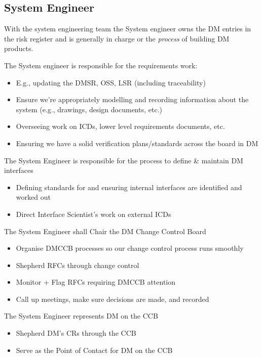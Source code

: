 \subsection{System Engineer \label{role:sysengineer}}
With the system engineering team  
 the System engineer 
 owns the DM entries in the risk register and is generally in charge or the {\em process} of building DM products. 

The System engineer  
is responsible for the requirements work:
\begin{itemize}
\item E.g., updating the DMSR, OSS, LSR (including traceability)
\item Ensure we’re appropriately modelling and recording information about the system (e.g.,
    drawings, design documents, etc.)
\item Overseeing work on ICDs, lower level requirements documents, etc.
\item Ensuring we have a solid verification plans/standards across the board in DM
\end{itemize}

The System Engineer is responsible for the process to define \& maintain DM interfaces
\begin{itemize}
\item Defining standards for and ensuring internal interfaces are identified and worked out
\item Direct Interface Scientist's work on external ICDs
\end{itemize}

The System Engineer shall Chair the DM Change Control Board 
\begin{itemize}
\item Organise DMCCB  processes so our change control process runs smoothly
\item Shepherd RFCs through change control
\item Monitor + Flag RFCs requiring DMCCB  attention
\item Call up meetings, make sure decisions are made, and recorded
\end{itemize}

The System Engineer represents DM on the CCB
\begin{itemize}
\item Shepherd DM’s CRs through the CCB
\item Serve as the Point of Contact for DM on the CCB
\end{itemize}

